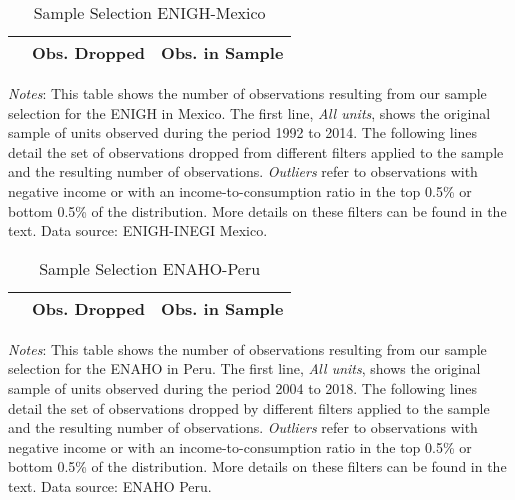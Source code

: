 \documentclass[12pt]{article}
\begin{document}
\begin{spacing}{1.5}
\begin{table}[H]
\begin{centering}
\captionsetup{justification=centering}
    \caption{Sample Selection ENIGH-Mexico  \label{observations_mexico}}
    \vspace*{-0.2em}
    \begin{tabular}{lcc}
    \midrule \midrule
     &Obs. Dropped & Obs. in Sample \\
    \toprule

       \midrule \midrule
    \end{tabular}
    \end{centering}
    \flushleft\footnotesize{\textit{Notes}: This table shows the number of observations resulting from our sample selection for the ENIGH in Mexico. The first line, \textit{All units}, shows the original sample of units observed during the period 1992 to 2014. The following lines detail the set of observations dropped from different filters applied to the sample and the resulting number of observations. \textit{Outliers} refer to observations  with negative income or with an income-to-consumption ratio in the top 0.5\% or bottom 0.5\% of the distribution. More details on these filters can be found in the text.  Data source: ENIGH-INEGI Mexico.}
\end{table}


\begin{table}[H]
\begin{centering}
\captionsetup{justification=centering}
    \caption{Sample Selection ENAHO-Peru  \label{observations_peru}}
    \vspace*{-0.2em}
    \begin{tabular}{lcc}
    \midrule \midrule
     &Obs. Dropped & Obs. in Sample \\
    \toprule

       \midrule \midrule
    \end{tabular}
    \end{centering}
    \flushleft\footnotesize{\textit{Notes}: This table shows the number of observations resulting from our sample selection for the ENAHO in Peru. The first line, \textit{All units}, shows the original sample of units observed during the period 2004 to 2018. The following lines detail the set of observations dropped by different filters applied to the sample and the resulting number of observations. \textit{Outliers} refer to observations  with negative income or with an income-to-consumption ratio in the top 0.5\% or bottom 0.5\% of the distribution.  More details on these filters can be found in the text. Data source: ENAHO Peru.}
\end{table}



\end{spacing}
\end{document}
